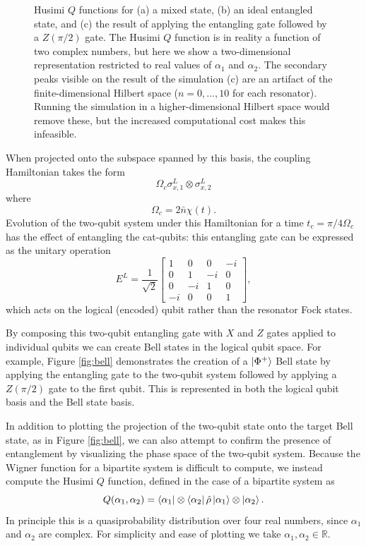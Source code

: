 \begin{figure}[t]
\begin{subfigure}[b]{0.31\textwidth}
         \caption{}
         \label{fig:ideal_cat}
     \end{subfigure}
        \caption{Husimi $Q$ functions for (a) a mixed state, (b) an ideal entangled state, and (c) the result of applying the entangling gate followed by a $Z(\pi/2)$ gate. The Husimi $Q$ function is in reality a function of two complex numbers, but here we show a two-dimensional representation restricted to real values of $\alpha_1$ and $\alpha_2$. The secondary peaks visible on the result of the simulation (c) are an artifact of the finite-dimensional Hilbert space ($n=0,\ldots,10$ for each resonator). Running the simulation in a higher-dimensional Hilbert space would remove these, but the increased computational cost makes this infeasible.}
        \label{fig:Q}
\end{figure}

When projected onto the subspace spanned by this basis, the coupling Hamiltonian takes the form \cite{mirrahimi_2014}
\[
    \Omega_c \sigma_{x,1}^L \otimes \sigma_{x,2}^L
\]
where
\[
    \Omega_c = 2 \bar{n} \chi(t).
\]
Evolution of the two-qubit system under this Hamiltonian for a time $t_c = \pi/4\Omega_c$ has the effect of entangling the cat-qubits: this entangling gate can be expressed as the unitary operation
\[
    E^L = \frac {1} {\sqrt{2}} \begin{bmatrix}
        1 & 0 & 0 & -i \\
        0 & 1 & -i & 0 \\
        0 & -i & 1 & 0 \\
        -i & 0 & 0 & 1
    \end{bmatrix},
\]
which acts on the logical (encoded) qubit rather than the resonator Fock states.

By composing this two-qubit entangling gate with $X$ and $Z$ gates applied to individual qubits we can create Bell states in the logical qubit space.
For example, Figure \ref{fig:bell} demonstrates the creation of a $\ket{\Phi^+}$ Bell state by applying the entangling gate to the two-qubit system followed by applying a $Z(\pi/2)$ gate to the first qubit.
This is represented in both the logical qubit basis and the Bell state basis.

In addition to plotting the projection of the two-qubit state onto the target Bell state, as in Figure \ref{fig:bell}, we can also attempt to confirm the presence of entanglement by visualizing the phase space of the two-qubit system.
Because the Wigner function for a bipartite system is difficult to compute, we instead compute the Husimi $Q$ function, defined in the case of a bipartite system as
\begin{equation} \label{eq:Q}
    Q(\alpha_1, \alpha_2) = \bra{\alpha_1} \otimes \bra{\alpha_2} \hat{\rho} \ket{\alpha_1} \otimes \ket{\alpha_2}.
\end{equation}
In principle this is a quasiprobability distribution over four real numbers, since $\alpha_1$ and $\alpha_2$ are complex.
For simplicity and ease of plotting we take $\alpha_1, \alpha_2 \in \mathbb{R}$.


